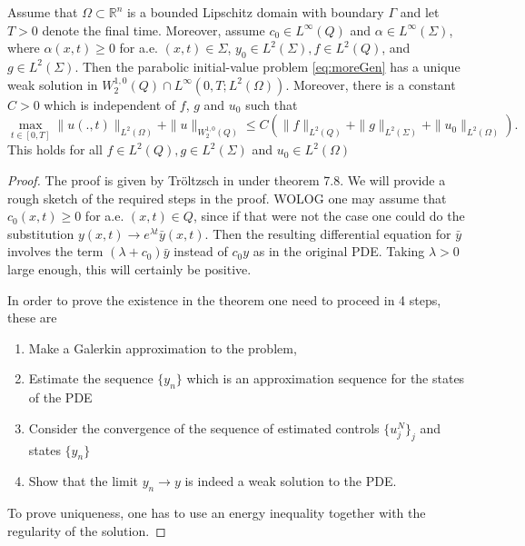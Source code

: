 \begin{theorem} Assume that $\Omega \subset \mathbb{R}^n$ is a bounded Lipschitz domain with boundary $\Gamma$ and let $T>0$ denote the final time. Moreover, assume $c_0 \in L^{\infty}(Q)$ and $\alpha \in L^{\infty}(\Sigma)$, where $\alpha(x,t) \geq 0$ for a.e. $(x,t) \in \Sigma$, $y_0 \in L^2(\Sigma), f \in L^2(Q)$, and $g \in L^2(\Sigma)$. Then the parabolic initial-value problem \eqref{eq:moreGen} has a unique weak solution in $W_2^{1,0}(Q) \cap L^{\infty}(0,T;L^2(\Omega))$. Moreover, there is a constant $C>0$ which is independent of $f$, $g$ and $u_0$ such that 
\begin{equation*}
    \max_{t \in [0,T]} \|u(.,t)\|_{L^2(\Omega)} + \|u\|_{W_2^{1,0}(Q)} \leq C\left(\|f\|_{L^2(Q)} + \|g\|_{L^2(\Sigma)} + \|u_0\|_{L^2(\Omega)}\right).
\end{equation*}
This holds for all $f \in L^2(Q), g \in L^2(\Sigma)$ and $u_0 \in L^2(\Omega)$
\end{theorem}

\begin{proof}
The proof is given by Tröltzsch in \cite{optimalControl} under theorem 7.8. We will provide a rough sketch of the required steps in the proof. WOLOG one may assume that $c_0(x,t)\geq 0$ for a.e. $(x,t) \in Q$, since if that were not the case one could do the substitution $y(x,t) \rightarrow e^{\lambda t}\bar{y}(x,t)$. Then the resulting differential equation for $\bar{y}$ involves the term $(\lambda + c_0)\bar{y}$ instead of $c_0y$ as in the original PDE. Taking $\lambda >0$ large enough, this will certainly be positive. 

In order to prove the existence in the theorem one need to proceed in 4 steps, these are

\begin{enumerate}
    \item Make a Galerkin approximation to the problem,
    \item Estimate the sequence $\{y_n \}$ which is an approximation sequence for the states of the PDE
    \item Consider the convergence of the sequence of estimated controls $\{u_j^N\}_j$ and states $\{ y_n \}$
    \item Show that the limit $y_n \rightarrow y$ is indeed a weak solution to the PDE.
\end{enumerate}
To prove uniqueness, one has to use an energy inequality together with the regularity of the solution.
\end{proof}


